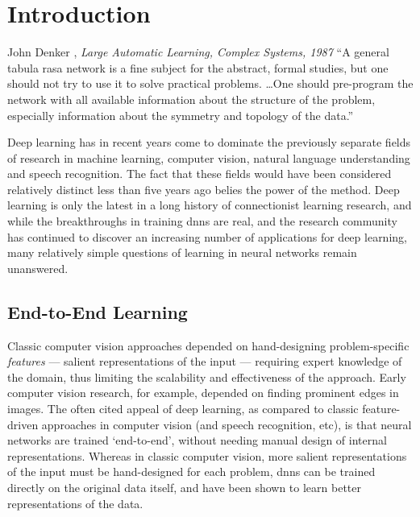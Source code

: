 \documentclass[thesis]{subfiles}
\begin{document}

\chapter{Introduction}  %
\begin{chapquote}{John Denker \etal, \textit{Large Automatic Learning, Complex Systems, 1987}}
	``A general tabula rasa network is a fine subject for the abstract, formal studies, but one should not try to use it to solve practical problems. \ldots One should pre-program the network with all available information about the structure of the problem, especially information about the symmetry and topology of the data.''
\end{chapquote}
Deep learning has in recent years come to dominate the previously separate fields of research in machine learning, computer vision, natural language understanding and speech recognition. The fact that these fields would have been considered relatively distinct less than five years ago belies the power of the method. Deep learning is only the latest in a long history of connectionist learning research, and while the breakthroughs in training \glspl{dnn} are real, and the research community has continued to discover an increasing number of applications for deep learning, many relatively simple questions of learning in neural networks remain unanswered. %

\section{End-to-End Learning}
Classic computer vision approaches depended on hand-designing problem-specific \emph{features} --- salient representations of the input --- requiring expert knowledge of the domain, thus limiting the scalability and effectiveness of the approach. Early computer vision research, for example, depended on finding prominent edges in images. The often cited appeal of deep learning, as compared to classic feature-driven approaches in computer vision (and speech recognition, etc), is that neural networks are trained `end-to-end', \ie without needing manual design of internal representations. Whereas in classic computer vision, more salient representations of the input must be hand-designed for each problem, \glspl{dnn} can be trained directly on the original data itself, and have been shown to learn better representations of the data.
\end{document}
